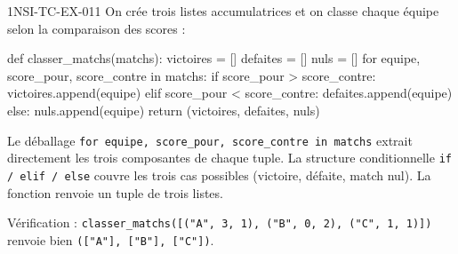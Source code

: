 \begin{corrige}{1NSI-TC-EX-011}
On crée trois listes accumulatrices et on classe chaque équipe selon la comparaison des scores :

\begin{python}
def classer_matchs(matchs):
    victoires = []
    defaites = []
    nuls = []
    for equipe, score_pour, score_contre in matchs:
        if score_pour > score_contre:
            victoires.append(equipe)
        elif score_pour < score_contre:
            defaites.append(equipe)
        else:
            nuls.append(equipe)
    return (victoires, defaites, nuls)
\end{python}

Le déballage \lstinline{for equipe, score_pour, score_contre in matchs} extrait directement les trois composantes de chaque tuple. La structure conditionnelle \lstinline{if / elif / else} couvre les trois cas possibles (victoire, défaite, match nul). La fonction renvoie un tuple de trois listes.

Vérification : \lstinline{classer_matchs([("A", 3, 1), ("B", 0, 2), ("C", 1, 1)])} renvoie bien \lstinline{(["A"], ["B"], ["C"])}.
\end{corrige}
